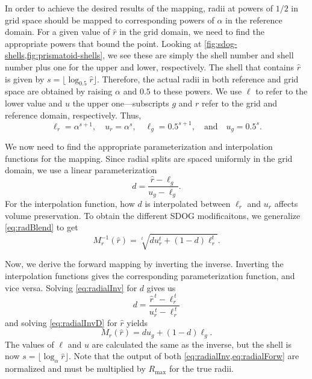 In order to achieve the desired results of the mapping, radii at powers of $1/2$ in grid space should be mapped to corresponding powers of $\alpha$ in the reference domain.
For a given value of $\hat{r}$ in the grid domain, we need to find the appropriate powers that bound the point.
Looking at \cref{fig:sdog-shells,fig:prismatoid-shells}, we see these are simply the shell number and shell number plus one for the upper and lower, respectively.
The shell that contains $\hat{r}$ is given by $s = \lfloor \log_{0.5} \hat{r} \rfloor$.
Therefore, the actual radii in both reference and grid space are obtained by raising $\alpha$ and $0.5$ to these powers.
We use $\ell$ to refer to the lower value and $u$ the upper one---subscripts $g$ and $r$ refer to the grid and reference domain, respectively.
Thus,
%
\begin{equation*}
\ell_r = \alpha^{s + 1}, \quad u_r = \alpha^s, \quad \ell_g = 0.5^{s + 1}, \quad \text{and} \quad u_g = 0.5^s.
\end{equation*}
%

We now need to find the appropriate parameterization and interpolation functions for the mapping.
Since radial splits are spaced uniformly in the grid domain, we use a linear parameterization
%
\begin{equation} \label{eq:radialInvD}
d = \frac{ \hat{r} - \ell_g }{ u_g - \ell_g }.
\end{equation}
%
For the interpolation function, how $d$ is interpolated between $\ell_r$ and $u_r$ affects volume preservation.
To obtain the different SDOG modificaitons, we generalize \cref{eq:radBlend} to get
%
\begin{equation} \label{eq:radialInv}
M_r^{-1}(\hat{r}) = \sqrt[t]{ d u_r^{t} + \left( 1 - d \right) \ell_r^{t} }.
\end{equation}
%


Now, we derive the forward mapping by inverting the inverse.
Inverting the interpolation functions gives the corresponding parameterization function, and vice versa.
Solving \cref{eq:radialInv} for $d$ gives us
%
\begin{equation} \label{eq:radialForwD}
d = \frac{ \hat{r}^{\,t} - \ell_r^{\,t} }{ u_r^{\,t} - \ell_r^{\,t} }
\end{equation}
%
and solving \cref{eq:radialInvD} for $\hat{r}$ yields
%
\begin{equation} \label{eq:radialForw}
M_r (\hat{r}) = d u_g + \left( 1 - d \right) \ell_g.
\end{equation}
%
The values of $\ell$ and $u$ are calculated the same as the inverse, but the shell is now $s = \lfloor \log_{\alpha} \hat{r} \rfloor$.
Note that the output of both \cref{eq:radialInv,eq:radialForw} are normalized and must be multiplied by $R_\mathrm{max}$ for the true radii.


